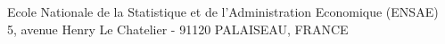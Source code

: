 \begin{titlepage}
\vfill

\begin{center}
  \footnotesize{Ecole Nationale de la Statistique et de l'Administration Economique (ENSAE)\\
  5, avenue Henry Le Chatelier - 91120 PALAISEAU, FRANCE}
\end{center}

\end{titlepage}

\restoregeometry
